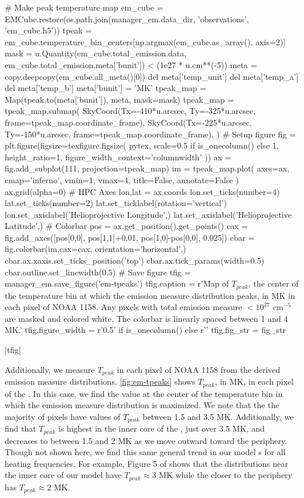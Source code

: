 \begin{pycode}[manager_em]
# Make peak temperature map
em_cube = EMCube.restore(os.path.join(manager_em.data_dir, 'observations', 'em_cube.h5'))
tpeak = em_cube.temperature_bin_centers[np.argmax(em_cube.as_array(), axis=2)]
mask = u.Quantity(em_cube.total_emission.data, em_cube.total_emission.meta['bunit']) < (1e27 * u.cm**(-5))
meta = copy.deepcopy(em_cube.all_meta()[0])
del meta['temp_unit']
del meta['temp_a']
del meta['temp_b']
meta['bunit'] = 'MK'
tpeak_map = Map(tpeak.to(meta['bunit']), meta, mask=mask)
tpeak_map = tpeak_map.submap(
    SkyCoord(Tx=-410*u.arcsec, Ty=-325*u.arcsec, frame=tpeak_map.coordinate_frame),
    SkyCoord(Tx=-225*u.arcsec, Ty=-150*u.arcsec, frame=tpeak_map.coordinate_frame),
)
# Setup figure
fig = plt.figure(figsize=texfigure.figsize(
    pytex,
    scale=0.5 if is_onecolumn() else 1,
    height_ratio=1,
    figure_width_context='columnwidth'
))
ax = fig.add_subplot(111, projection=tpeak_map)
im = tpeak_map.plot(
    axes=ax,
    cmap='inferno',
    vmin=1,
    vmax=4,
    title=False,
    annotate=False
)
ax.grid(alpha=0)
# HPC Axes
lon,lat = ax.coords
lon.set_ticks(number=4)
lat.set_ticks(number=2)
lat.set_ticklabel(rotation='vertical')
lon.set_axislabel('Helioprojective Longitude',)
lat.set_axislabel('Helioprojective Latitude',)
# Colorbar
pos = ax.get_position().get_points()
cax = fig.add_axes([pos[0,0], pos[1,1]+0.01, pos[1,0]-pos[0,0], 0.025])
cbar = fig.colorbar(im,cax=cax, orientation='horizontal',)
cbar.ax.xaxis.set_ticks_position('top')
cbar.ax.tick_params(width=0.5)
cbar.outline.set_linewidth(0.5)
# Save figure
tfig = manager_em.save_figure('em-tpeaks')
tfig.caption = r'Map of $T_{peak}$, the center of the temperature bin at which the emission measure distribution peaks, in MK in each pixel of \AR{} NOAA 1158. Any pixels with total emission measure $<10^{27}$ cm$^{-5}$ are masked and colored white. The colorbar is linearly spaced between 1 and 4 MK.'
tfig.figure_width = r'0.5\columnwidth' if is_onecolumn() else r'\columnwidth'
tfig.fig_str = fig_str
\end{pycode}
\py[manager_em]|tfig|

Additionally, we measure $T_{peak}$ in each pixel of \AR{} NOAA 1158 from the derived emission measure distributions.
\autoref{fig:em-tpeaks} shows $T_{peak}$, in MK, in each pixel of the \AR{}.
In this case, we find the value at the center of the temperature bin in which the emission measure distribution is maximized.
We note that the the majority of pixels have values of $T_{peak}$ between 1.5 and 3.5 MK.
Additionally, we find that $T_{peak}$ is highest in the inner core of the \AR{}, just over 3.5 MK, and decreases to between 1.5 and 2 MK as we move outward toward the periphery.
Though not shown here, we find this same general trend in our model \AR s for all heating frequencies.
For example, Figure 5 of  shows that the \dem distributions near the inner core of our model \AR{} have $T_{peak}\approx3$ MK while the \dem closer to the periphery has $T_{peak}\approx2$ MK.

